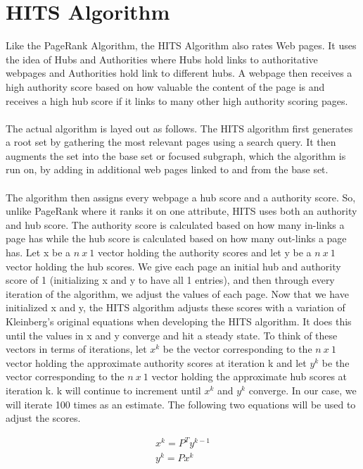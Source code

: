 \documentclass{article}
\begin{document}
\section{HITS Algorithm}
Like the PageRank Algorithm, the HITS Algorithm also rates Web pages. It uses the idea of Hubs and Authorities where Hubs hold links to authoritative webpages and Authorities hold link to different hubs. A webpage then receives a high authority score based on how valuable the content of the page is and receives a high hub score if it links to many other high authority scoring pages. \\
\\
The actual algorithm is layed out as follows. The HITS algorithm first generates a root set by gathering the most relevant pages using a search query. It then augments the set into the base set or focused subgraph, which the algorithm is run on, by adding in additional web pages linked to and from the base set.\\
\\
The algorithm then assigns every webpage a hub score and a authority score. So, unlike PageRank where it ranks it on one attribute, HITS uses both an authority and hub score. The authority score is calculated based on how many in-links a page has while the hub score is calculated based on how many out-links a page has. Let x be a $n \: x \:1$ vector holding the authority scores and let y be a $n\: x \: 1$ vector holding the hub scores. We give each page an initial hub and authority score of 1 (initializing x and y to have all 1 entries), and then through every iteration of the algorithm, we adjust the values of each page. Now that we have initialized x and y, the HITS algorithm adjusts these scores with a variation of Kleinberg's original equations when developing the HITS algorithm. It does this until the values in x and y converge and hit a steady state. To think of these vectors in terms of iterations, let $x^k$ be the vector corresponding to the $n \: x\: 1$ vector holding the approximate authority scores at iteration k and let $y^k$ be the vector corresponding to the $n \: x \: 1$ vector holding the approximate hub scores at iteration k. k will continue to increment until $x^k$ and $y^k$ converge. In our case, we will iterate 100 times as an estimate. The following two equations will be used to adjust the scores.

\begin{align*}
    x^k = P^Ty^{k-1}\\
    y^k = Px^k
\end{align*}
\end{document}
